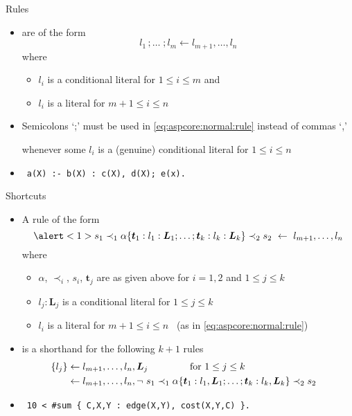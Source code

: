 \begin{frame}{Rules}
  \begin{itemize}
  \item {} are of the form
    \begin{equation}
      \label{eq:aspcore:normal:rule}
       l_1\,;\dots\;;l_m\leftarrow  l_{m+1},\dots, l_n
    \end{equation}
    where
    \begin{itemize}
    \item $l_i$ is a conditional literal for $1\leq i\leq m$ and
    \item $l_i$ is a literal for $m+1\leq i\leq n$
    \end{itemize}
    \medskip
  \item<2->  Semicolons `;' must be used in \eqref{eq:aspcore:normal:rule} instead of commas `,'
    \par whenever some $l_i$ is a (genuine) conditional literal for $1\leq i\leq n$
  \item<3->  \  \texttt{a(X) :- b(X) : c(X), d(X)\alert{;} e(x).}
  \end{itemize}
\end{frame}
\begin{frame}{Shortcuts}
  \begin{itemize}
  \item A rule of the form
    \[
    \alert<1>{s_1\prec_1\alpha\{\boldsymbol{t}_1:l_1:\boldsymbol{L}_1;\dots;\boldsymbol{t}_k:l_k:\boldsymbol{L}_k\}\prec_2 s_2}
    \ \leftarrow \
     l_{m+1},\dots, l_n
    \]
    where
    \begin{itemize}
    \item $\alpha$, $\prec_i$, $s_i$, $\boldsymbol{t}_j$ are as given above for $i=1,2$ and $1\leq j\leq k$
    \item $l_j:\boldsymbol{L}_j$ is a conditional literal for $1\leq j\leq k$
    \item $l_i$ is a literal for $m+1\leq i\leq n$ \ (as in \eqref{eq:aspcore:normal:rule})
    \end{itemize}
    \medskip
  \item<2->[] is a shorthand for the following $k+1$ rules
    \begin{align*}\hspace{-10pt}
      \{ l_j\}&\leftarrow  l_{m+1},\dots, l_n,\boldsymbol{L}_j\qquad\qquad\text{ for }1\leq j\leq k\\
                &\leftarrow  l_{m+1},\dots, l_n,\neg{~s_1\prec_1\alpha\{\boldsymbol{t}_1:l_1,\boldsymbol{L}_1;\dots;\boldsymbol{t}_k:l_k,\boldsymbol{L}_k\}\prec_2 s_2}
      \end{align*}
  \item<3->  \
    \texttt{10 < {\#sum} \{ C,X,Y : edge(X,Y), cost(X,Y,C) \}.}
  \end{itemize}
\end{frame}
